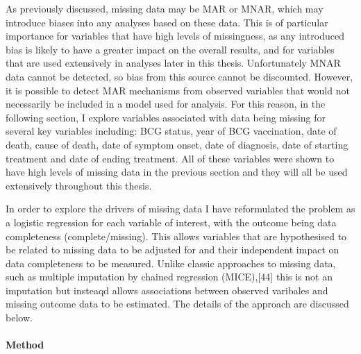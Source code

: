 \documentclass[11pt,twoside]{bristolthesis}
\begin{document}
  As previously discussed, missing data may be MAR or MNAR, which may introduce biases into any analyses based on these data. This is of particular importance for variables that have high levels of missingness, as any introduced bias is likely to have a greater impact on the overall results, and for variables that are used extensively in analyses later in this thesis. Unfortunately MNAR data cannot be detected, so bias from this source cannot be discounted. However, it is possible to detect MAR mechanisms from observed variables that would not necessarily be included in a model used for analysis. For this reason, in the following section, I explore variables associated with data being missing for several key variables including: BCG status, year of BCG vaccination, date of death, cause of death, date of symptom onset, date of diagnosis, date of starting treatment and date of ending treatment. All of these variables were shown to have high levels of missing data in the previous section and they will all be used extensively throughout this thesis.
  
  In order to explore the drivers of missing data I have reformulated the problem as a logistic regression for each variable of interest, with the outcome being data completeness (complete/missing). This allows variables that are hypothesised to be related to missing data to be adjusted for and their independent impact on data completeness to be measured. Unlike classic approaches to missing data, such as multiple imputation by chained regression (MICE),{[}44{]} this is not an imputation but insteaqd allows associations between observed varibales and missing outcome data to be estimated. The details of the approach are discussed below.
  
  \hypertarget{method}{%
  \paragraph{Method}\label{method}}
  
\end{document}
